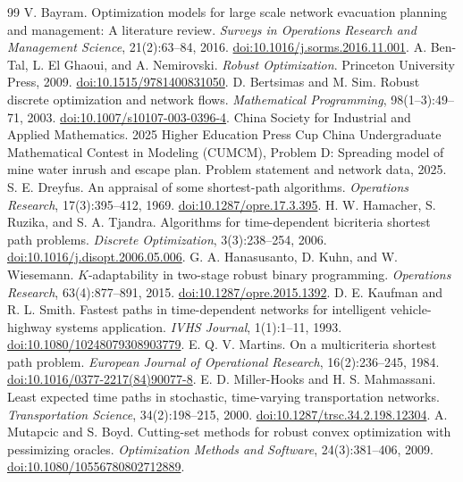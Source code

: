 \documentclass[11pt,a4paper]{article}
\begin{document}
\begin{thebibliography}{99}\small
{} V. Bayram. Optimization models for large scale network evacuation planning and management: A literature review. \emph{Surveys in Operations Research and Management Science}, 21(2):63--84, 2016. \href{https://doi.org/10.1016/j.sorms.2016.11.001}{doi:10.1016/j.sorms.2016.11.001}.
 A. Ben-Tal, L. El Ghaoui, and A. Nemirovski. \emph{Robust Optimization}. Princeton University Press, 2009. \href{https://doi.org/10.1515/9781400831050}{doi:10.1515/9781400831050}.
 D. Bertsimas and M. Sim. Robust discrete optimization and network flows. \emph{Mathematical Programming}, 98(1--3):49--71, 2003. \href{https://doi.org/10.1007/s10107-003-0396-4}{doi:10.1007/s10107-003-0396-4}.
 China Society for Industrial and Applied Mathematics. 2025 Higher Education Press Cup China Undergraduate Mathematical Contest in Modeling (CUMCM), Problem D: Spreading model of mine water inrush and escape plan. Problem statement and network data, 2025.
 S. E. Dreyfus. An appraisal of some shortest-path algorithms. \emph{Operations Research}, 17(3):395--412, 1969. \href{https://doi.org/10.1287/opre.17.3.395}{doi:10.1287/opre.17.3.395}.
 H. W. Hamacher, S. Ruzika, and S. A. Tjandra. Algorithms for time-dependent bicriteria shortest path problems. \emph{Discrete Optimization}, 3(3):238--254, 2006. \href{https://doi.org/10.1016/j.disopt.2006.05.006}{doi:10.1016/j.disopt.2006.05.006}.
 G. A. Hanasusanto, D. Kuhn, and W. Wiesemann. $K$-adaptability in two-stage robust binary programming. \emph{Operations Research}, 63(4):877--891, 2015. \href{https://doi.org/10.1287/opre.2015.1392}{doi:10.1287/opre.2015.1392}.
 D. E. Kaufman and R. L. Smith. Fastest paths in time-dependent networks for intelligent vehicle-highway systems application. \emph{IVHS Journal}, 1(1):1--11, 1993. \href{https://doi.org/10.1080/10248079308903779}{doi:10.1080/10248079308903779}.
 E. Q. V. Martins. On a multicriteria shortest path problem. \emph{European Journal of Operational Research}, 16(2):236--245, 1984. \href{https://doi.org/10.1016/0377-2217(84)90077-8}{doi:10.1016/0377-2217(84)90077-8}.
 E. D. Miller-Hooks and H. S. Mahmassani. Least expected time paths in stochastic, time-varying transportation networks. \emph{Transportation Science}, 34(2):198--215, 2000. \href{https://doi.org/10.1287/trsc.34.2.198.12304}{doi:10.1287/trsc.34.2.198.12304}.
 A. Mutapcic and S. Boyd. Cutting-set methods for robust convex optimization with pessimizing oracles. \emph{Optimization Methods and Software}, 24(3):381--406, 2009. \href{https://doi.org/10.1080/10556780802712889}{doi:10.1080/10556780802712889}.

\end{thebibliography}
\end{document}
